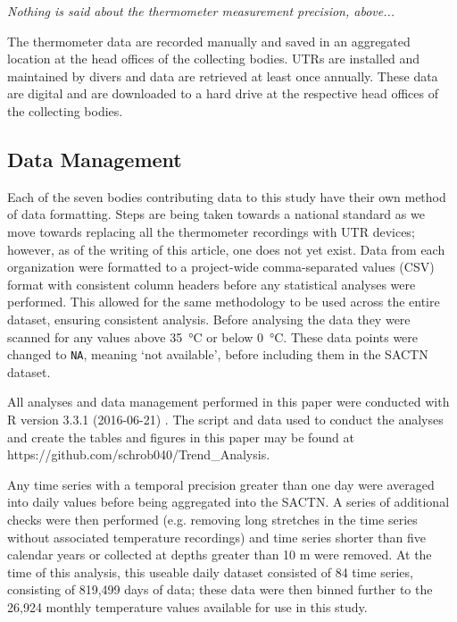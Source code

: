\documentclass[]{ametsoc}
\begin{document}
\emph{Nothing is said about the thermometer measurement precision, above...}

The thermometer data are recorded manually and saved in an aggregated location at the head offices of the collecting bodies. UTRs are installed and maintained by divers and data are retrieved at least once annually. These data are digital and are downloaded to a hard drive at the respective head offices of the collecting bodies.

\subsection{Data Management}
Each of the seven bodies contributing data to this study have their own method of data formatting. Steps are being taken towards a national standard as we move towards replacing all the thermometer recordings with UTR devices; however, as of the writing of this article, one does not yet exist. Data from each organization were formatted to a project-wide comma-separated values (CSV) format with consistent column headers before any statistical analyses were performed. This allowed for the same methodology to be used across the entire dataset, ensuring consistent analysis. Before analysing the data they were scanned for any values above \SI{35}{\degreeCelsius} or below \SI{0}{\degreeCelsius}. These data points were changed to \texttt{NA}, meaning `not available', before including them in the SACTN dataset.

All analyses and data management performed in this paper were conducted with R version 3.3.1 (2016-06-21) \citep{R}. The script and data used to conduct the analyses and create the tables and figures in this paper may be found at https://github.com/schrob040/Trend\_Analysis.

Any time series with a temporal precision greater than one day were averaged into daily values before being aggregated into the SACTN. A series of additional checks were then performed (e.g. removing long stretches in the time series without associated temperature recordings) and time series shorter than five calendar years or collected at depths greater than 10 m were removed. At the time of this analysis, this useable daily dataset consisted of 84 time series, consisting of 819,499 days of data; these data were then binned further to the 26,924 monthly temperature values available for use in this study.
\end{document}
